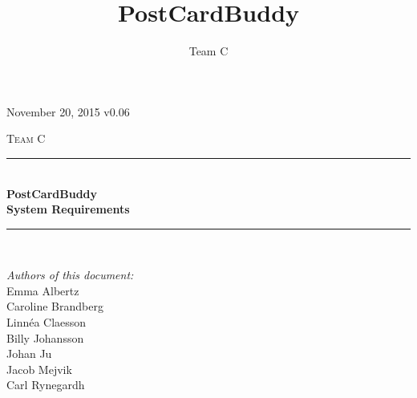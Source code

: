 \documentclass[10pt,a4paper]{article}
\title{PostCardBuddy}
\author{Team C}
\begin{document}
\begin{titlepage}
\newcommand{\HRule}{\rule{\linewidth}{0.5mm}}


\begin{flushright}
November 20, 2015 v0.06\\[3cm]
\end{flushright}


\centering
\textsc{\LARGE Team C}\\[0.5cm]

\HRule \\[0.4cm]
{ \huge \bfseries PostCardBuddy}\\[0.3cm]
{\Large \bfseries System Requirements}\\[0.4cm] %
\HRule \\[1.5cm]

\vfill
\begin{flushleft}
\textit{Authors of this document:}\\
Emma Albertz\\
Caroline Brandberg\\
Linnéa Claesson\\
Billy Johansson\\
Johan Ju\\
Jacob Mejvik\\
Carl Rynegardh
\end{flushleft}

\end{titlepage}



%



\setcounter{tocdepth}{2}
\tableofcontents
\newpage
{}


\end{document}
